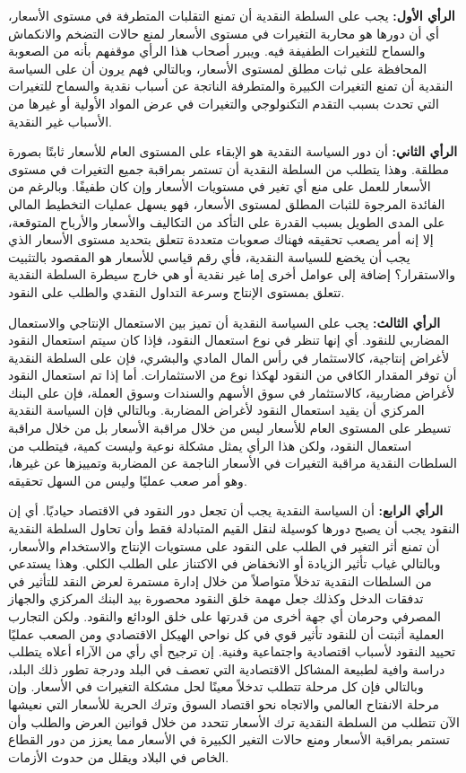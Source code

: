 \documentclass[10pt,a4paper]{report}
\begin{document}
\begin{doublespacing}
\textbf{الرأي الأول:} يجب على السلطة النقدية أن تمنع التقلبات المتطرفة في مستوى الأسعار، أي أن دورها هو محاربة التغيرات في مستوى الأسعار لمنع حالات التضخم والانكماش والسماح للتغيرات الطفيفة فيه. ويبرر أصحاب هذا الرأي موقفهم بأنه من الصعوبة المحافظة على ثبات مطلق لمستوى الأسعار، وبالتالي فهم يرون أن على السياسة النقدية أن تمنع التغيرات الكبيرة والمتطرفة الناتجة عن أسباب نقدية والسماح للتغيرات التي تحدث بسبب التقدم التكنولوجي والتغيرات في عرض المواد الأولية أو غيرها من الأسباب غير النقدية.

\textbf{الرأي الثاني:} أن دور السياسة النقدية هو الإبقاء على المستوى العام للأسعار ثابتًا بصورة مطلقة. وهذا يتطلب من السلطة النقدية أن تستمر بمراقبة جميع التغيرات في مستوى الأسعار للعمل على منع أي تغير في مستويات الأسعار وإن كان طفيفًا. وبالرغم من الفائدة المرجوة للثبات المطلق لمستوى الأسعار، فهو يسهل عمليات التخطيط المالي على المدى الطويل بسبب القدرة على التأكد من التكاليف والأسعار والأرباح المتوقعة، إلا إنه أمر يصعب تحقيقه فهناك صعوبات متعددة تتعلق بتحديد مستوى الأسعار الذي يجب أن يخضع للسياسة النقدية، فأي رقم قياسي للأسعار هو المقصود بالتثبيت والاستقرار؟ إضافة إلى عوامل أخرى إما غير نقدية أو هي خارج سيطرة السلطة النقدية تتعلق بمستوى الإنتاج وسرعة التداول النقدي والطلب على النقود.

\textbf{الرأي الثالث:} يجب على السياسة النقدية أن تميز بين الاستعمال الإنتاجي والاستعمال المضاربي للنقود. أي إنها تنظر في نوع استعمال النقود، فإذا كان سيتم استعمال النقود لأغراض إنتاجية، كالاستثمار في رأس المال المادي والبشري، فإن على السلطة النقدية أن توفر المقدار الكافي من النقود لهكذا نوع من الاستثمارات. أما إذا تم استعمال النقود لأغراض مضاربية، كالاستثمار في سوق الأسهم والسندات وسوق العملة، فإن على البنك المركزي أن يقيد استعمال النقود لأغراض المضاربة. وبالتالي فإن السياسة النقدية تسيطر على المستوى العام للأسعار ليس من خلال مراقبة الأسعار بل من خلال مراقبة استعمال النقود، ولكن هذا الرأي يمثل مشكلة نوعية وليست كمية، فيتطلب من السلطات النقدية مراقبة التغيرات في الأسعار الناجمة عن المضاربة وتمييزها عن غيرها، وهو أمر صعب عمليًا وليس من السهل تحقيقه.

\textbf{الرأي الرابع:} أن السياسة النقدية يجب أن تجعل دور النقود في الاقتصاد حياديًا. أي إن النقود يجب أن يصبح دورها كوسيلة لنقل القيم المتبادلة فقط وأن تحاول السلطة النقدية أن تمنع أثر التغير في الطلب على النقود على مستويات الإنتاج والاستخدام والأسعار، وبالتالي غياب تأثير الزيادة أو الانخفاض في الاكتناز على الطلب الكلي. وهذا يستدعي من السلطات النقدية تدخلاً متواصلاً من خلال إدارة مستمرة لعرض النقد للتأثير في تدفقات الدخل وكذلك جعل مهمة خلق النقود محصورة بيد البنك المركزي والجهاز المصرفي وحرمان أي جهة أخرى من قدرتها على خلق الودائع والنقود. ولكن التجارب العملية أثبتت أن للنقود تأثير قوي في كل نواحي الهيكل الاقتصادي ومن الصعب عمليًا تحييد النقود لأسباب اقتصادية واجتماعية وفنية. إن ترجيح أي رأي من الآراء أعلاه يتطلب دراسة وافية لطبيعة المشاكل الاقتصادية التي تعصف في البلد ودرجة تطور ذلك البلد، وبالتالي فإن كل مرحلة تتطلب تدخلاً معينًا لحل مشكلة التغيرات في الأسعار. وإن مرحلة الانفتاح العالمي والاتجاه نحو اقتصاد السوق وترك الحرية للأسعار التي نعيشها الآن تتطلب من السلطة النقدية ترك الأسعار تتحدد من خلال قوانين العرض والطلب وأن تستمر بمراقبة الأسعار ومنع حالات التغير الكبيرة في الأسعار مما يعزز من دور القطاع الخاص في البلاد ويقلل من حدوث الأزمات.

\end{doublespacing}
\end{document}
